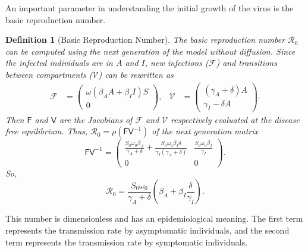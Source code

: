 \documentclass[11pt]{article}
\newcommand{\Ro}{\mathcal{R}_0}
\newcommand{\mat}[1]{\mathsf{#1}}
\newtheorem{definition}{Definition}
\begin{document}
		An important parameter in understanding the initial growth of the virus is the basic reproduction number.
		\begin{definition}[Basic Reproduction Number]
			The basic reproduction number $\Ro$ can be computed using the next generation of the model without diffusion.
			Since the infected individuals are in $A$ and $I$, new infections ($\mathcal{F}$) and transitions between compartments ($\mathcal{V}$) can be rewritten as
			\begin{align*}
				\mathcal{F} &= \begin{pmatrix} \omega (\beta_A A + \beta_I I) S \\ 0 \end{pmatrix}, &
				\mathcal{V} &= \begin{pmatrix} (\gamma_A + \delta) A \\ \gamma_I - \delta A \end{pmatrix}.
			\end{align*}
			Then $\mat{F}$ and $\mat{V}$ are the Jacobians of $\mathcal{F}$ and $\mathcal{V}$ respectively evaluated at the disease free equilibrium.
			Thus, $\Ro = \rho (\mat{F} \mat{V}^{-1})$ of the next generation matrix
			\begin{equation*}
				\mat{F} \mat{V}^{-1} = \begin{pmatrix} 
				\frac{S_0 \omega_0 \beta_A}{\gamma_A + \delta} + \frac{S_0 \omega_0 \beta_I \delta}{\gamma_I (\gamma_A + \delta)} & 
				\frac{S_0 \omega_0 \beta_I}{\gamma_I} \\ 
				0 & 0 \end{pmatrix}.
			\end{equation*}
			So,
			\begin{equation*} \label{eq:ro}
				\Ro =  \frac{S_0 \omega_0}{\gamma_A + \delta}  \left( \beta_A + \beta_I \frac{\delta}{\gamma_I} \right).
			\end{equation*}
		\end{definition}
		\noindent This number is dimensionless and has an epidemiological meaning.
		The first term represents the transmission rate by asymptomatic individuals, and the second term represents the transmission rate by symptomatic individuals.
			
\end{document}
